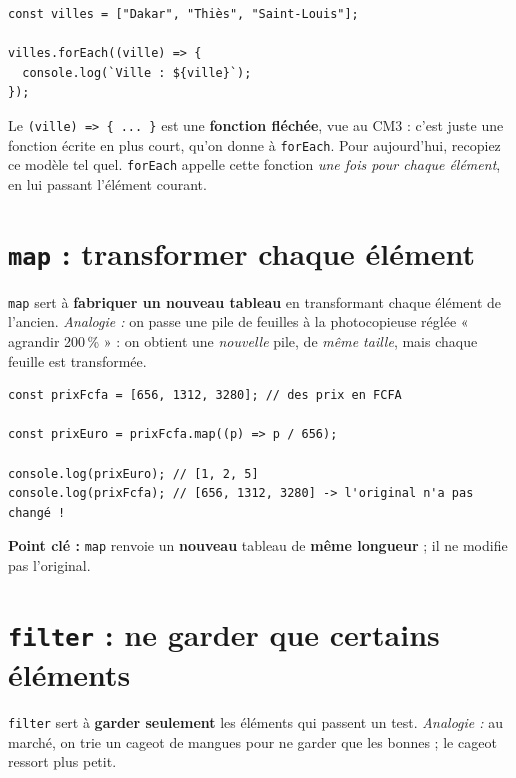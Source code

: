 \documentclass[11pt,a4paper]{article}
\newcommand{\code}[1]{\texttt{#1}}
\begin{document}
\begin{lstlisting}[style=js]
const villes = ["Dakar", "Thiès", "Saint-Louis"];

villes.forEach((ville) => {
  console.log(`Ville : ${ville}`);
});
\end{lstlisting}

\begin{infobox}[Rappel CM3 : la flèche \texttt{=>}]
Le \code{(ville) => \{ ... \}} est une \textbf{fonction fléchée}, vue au CM3 : c'est juste une fonction écrite en plus court, qu'on donne à \code{forEach}. Pour aujourd'hui, recopiez ce modèle tel quel. \code{forEach} appelle cette fonction \emph{une fois pour chaque élément}, en lui passant l'élément courant.
\end{infobox}

\section{\texttt{map} : transformer chaque élément}

\code{map} sert à \textbf{fabriquer un nouveau tableau} en transformant chaque élément de l'ancien. \emph{Analogie :} on passe une pile de feuilles à la photocopieuse réglée « agrandir 200\,\% » : on obtient une \emph{nouvelle} pile, de \emph{même taille}, mais chaque feuille est transformée.

\begin{lstlisting}[style=js]
const prixFcfa = [656, 1312, 3280]; // des prix en FCFA

const prixEuro = prixFcfa.map((p) => p / 656);

console.log(prixEuro); // [1, 2, 5]
console.log(prixFcfa); // [656, 1312, 3280] -> l'original n'a pas changé !
\end{lstlisting}

\textbf{Point clé :} \code{map} renvoie un \textbf{nouveau} tableau de \textbf{même longueur} ; il ne modifie pas l'original.

\section{\texttt{filter} : ne garder que certains éléments}

\code{filter} sert à \textbf{garder seulement} les éléments qui passent un test. \emph{Analogie :} au marché, on trie un cageot de mangues pour ne garder que les bonnes ; le cageot ressort plus petit.
\end{document}
